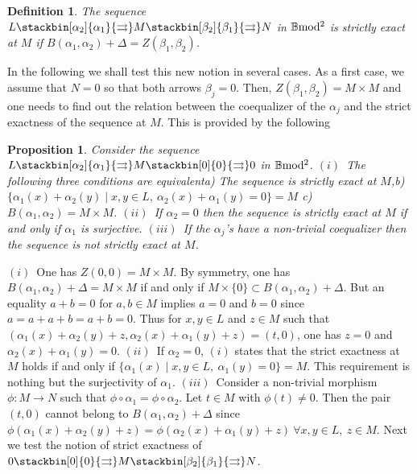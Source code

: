 \documentclass[12pt]{article}
\newtheorem{prop}[thm]{Proposition}
\newtheorem{defn}[thm]{Definition}
\def\B{{\mathbb B}}
\def\strg{strict }
\def\strgly{strictly }
\def\bm2{{\rm \B mod^2}}
\begin{document}
	\begin{defn}\label{exsequ} The sequence  $L \stackbin[\alpha_2]{\alpha_1}{\rightrightarrows}M\stackbin[\beta_2]{\beta_1}{\rightrightarrows}N$ in $\bm2$ is \strgly exact at $M$ if $ B(\alpha_1,\alpha_2)+\Delta=Z(\beta_1,\beta_2)$.
	\end{defn}
	
	In the following we shall test this new notion in several cases. As a first case, we assume that $N=0$ so that both arrows $\beta_j=0$. Then, $Z(\beta_1,\beta_2)=M\times M$ and one needs to find out the relation between the coequalizer of the $\alpha_j$ and the \strg exactness of the sequence at $M$. This is provided by the following
	\begin{prop}\label{surjtest} Consider the sequence $L \stackbin[\alpha_2]{\alpha_1}{\rightrightarrows}M\stackbin[0]{0}{\rightrightarrows}0$ in $\bm2$.  \newline
$(i)$~The following three conditions are equivalent\newline a) The sequence is  \strgly exact at $M$,\newline b) $
\{\alpha_1(x)+\alpha_2(y)\mid x,y\in L, \ \alpha_2(x)+\alpha_1(y)=0\}=M
$ \newline c) $B(\alpha_1,\alpha_2)=M\times M$.
\newline 
$(ii)$~If $\alpha_2=0$  then the sequence is  \strgly exact at $M$ if and only if $\alpha_1$ is surjective. \newline
$(iii)$~If the $\alpha_j$'s have a non-trivial coequalizer then the sequence is not  \strgly exact at $M$. 
\end{prop}
\proof $(i)$~One has $Z(0,0)=M\times M$. By symmetry, one has $ B(\alpha_1,\alpha_2)+\Delta=M\times M$ if and only if $M\times \{0\}\subset B(\alpha_1,\alpha_2)+\Delta$. But an equality $a+b=0$ for $a,b\in M$ implies $a=0$ and $b=0$ since $a=a+a+b=a+b=0$. Thus for $x,y\in L$ and $z\in M$ such that 
$
(\alpha_1(x)+\alpha_2(y)+z,\alpha_2(x)+\alpha_1(y)+z)=(t,0)
$, 
one has $z=0$ and $\alpha_2(x)+\alpha_1(y)=0$.\newline
$(ii)$~If $\alpha_2=0$, $(i)$ states that the \strg exactness at $M$ holds if and only if
$
\{\alpha_1(x)\mid x,y\in L, \ \alpha_1(y)=0\}=M
$. This requirement is nothing but the surjectivity of $\alpha_1$.\newline
$(iii)$~Consider a non-trivial morphism $\phi:M\to N$ such that $\phi\circ \alpha_1=\phi\circ \alpha_2$. Let $t\in M$ with $\phi(t)\neq 0$. Then the pair $(t,0)$ cannot belong to $B(\alpha_1,\alpha_2)+\Delta$ since 
$
\phi(\alpha_1(x)+\alpha_2(y)+z)=\phi(\alpha_2(x)+\alpha_1(y)+z)~ \forall x,y\in L,\ z\in M
$.
\endproof
Next we test the notion of \strg exactness of $
0 \stackbin[0]{0}{\rightrightarrows}M\stackbin[\beta_2]{\beta_1}{\rightrightarrows}N
$.
\end{document}
